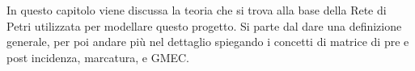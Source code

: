 In questo capitolo viene discussa la teoria che si trova alla base 
della Rete di Petri utilizzata per modellare questo progetto. Si parte 
dal dare una definizione generale, per poi andare più nel dettaglio 
spiegando i concetti di matrice di pre e post incidenza, marcatura, e GMEC.